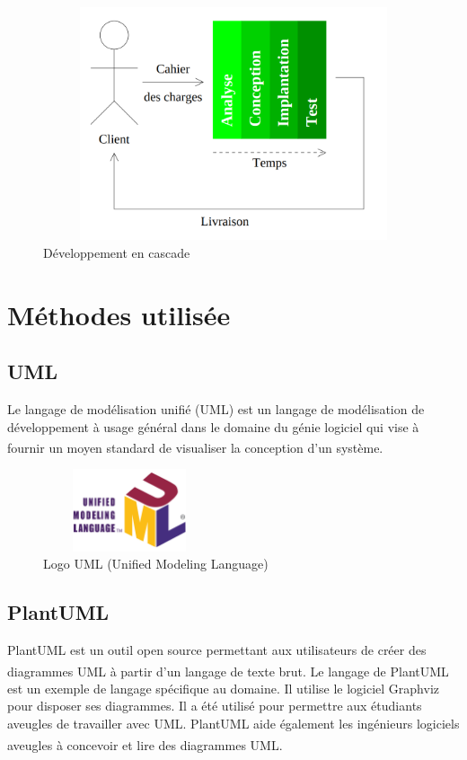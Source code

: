 \documentclass[12pt]{report}
\begin{document}
\begin{figure}[h]
\centering
    \includegraphics[width = 5in, height = 2.7in]{../Images/Analyse_Conception.png}
\caption{Développement en cascade}
\end{figure}

\newpage

\section{Méthodes utilisée}

\subsection{UML}
Le langage de modélisation unifié (UML) est un langage de modélisation de développement à usage général dans le domaine du génie logiciel qui vise à fournir un moyen standard de visualiser la conception d'un système.\textsuperscript{\cite{booch2005unified}}

\begin{figure}[h]
\centering
    \includegraphics[width = 2in, height = 0.95in]{../Images/UMLlogo.png}
  \caption{Logo UML (Unified Modeling Language)}
\end{figure}

\vspace*{-0.3in}

\subsection{PlantUML}
PlantUML est un outil open source permettant aux utilisateurs de cr\'eer des diagrammes UML \`a partir d'un langage de texte brut. Le langage de PlantUML\textsuperscript{\cite{roques2017plantuml}} est un exemple de langage sp\'ecifique au domaine. Il utilise le logiciel Graphviz pour disposer ses diagrammes. Il a \'et\'e utilis\'e pour permettre aux \'etudiants aveugles de travailler avec UML\@. PlantUML aide \'egalement les ing\'enieurs logiciels aveugles \`a concevoir et lire des diagrammes UML\@.\textsuperscript{\cite{booch2005unified}}
\end{document}
